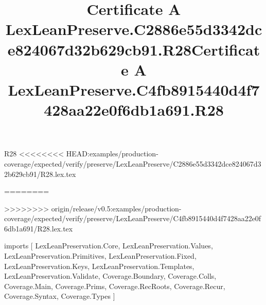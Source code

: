 \begin{lexlean}{R28}
<<<<<<<< HEAD:examples/production-coverage/expected/verify/preserve/LexLeanPreserve/C2886e55d3342dce824067d32b629cb91/R28.lex.tex
\title{Certificate A LexLeanPreserve.C2886e55d3342dce824067d32b629cb91.R28}
========
\title{Certificate A LexLeanPreserve.C4fb8915440d4f7428aa22e0f6db1a691.R28}
>>>>>>>> origin/release/v0.5:examples/production-coverage/expected/verify/preserve/LexLeanPreserve/C4fb8915440d4f7428aa22e0f6db1a691/R28.lex.tex
\begin{coremodule}
imports [
  LexLeanPreservation.Core,
  LexLeanPreservation.Values,
  LexLeanPreservation.Primitives,
  LexLeanPreservation.Fixed,
  LexLeanPreservation.Keys,
  LexLeanPreservation.Templates,
  LexLeanPreservation.Validate,
  Coverage.Boundary,
  Coverage.Colls,
  Coverage.Main,
  Coverage.Prims,
  Coverage.RecRoots,
  Coverage.Recur,
  Coverage.Syntax,
  Coverage.Types
]


\end{coremodule}
\end{lexlean}
